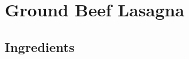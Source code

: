 \thispagestyle{fancy}
\section{Ground Beef Lasagna}
\AddToShipoutPicture*{\Lasagna}

\subsection*{Ingredients}